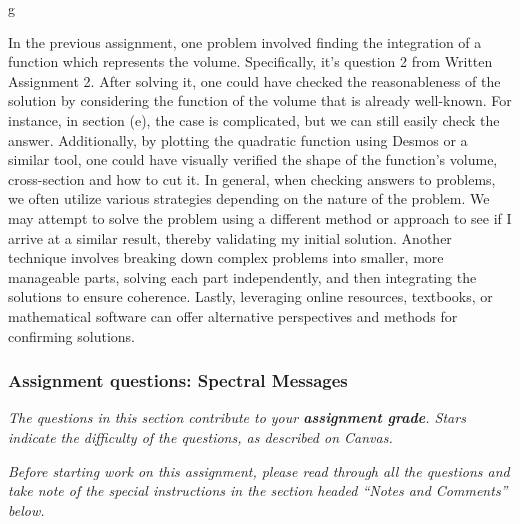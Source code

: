\documentclass{exam}
\begin{document}
\begin{questions}

g
\begin{solution}
    In the previous assignment, one problem involved finding the integration of a function which represents the volume. Specifically, it's question 2 from Written Assignment 2.  After solving it, one could have checked the reasonableness of the solution by considering the function of the volume that is already well-known. For instance, in section (e), the case is complicated, but we can still easily check the answer. Additionally, by plotting the quadratic function using Desmos or a similar tool, one could have visually verified the shape of the function's volume, cross-section and how to cut it. In general, when checking answers to problems, we often utilize various strategies depending on the nature of the problem. We may attempt to solve the problem using a different method or approach to see if I arrive at a similar result, thereby validating my initial solution. Another technique involves breaking down complex problems into smaller, more manageable parts, solving each part independently, and then integrating the solutions to ensure coherence. Lastly, leveraging online resources, textbooks, or mathematical software can offer alternative perspectives and methods for confirming solutions.
\end{solution}

\end{questions}
\vfill\clearpage

\subsubsection*{Assignment questions: Spectral Messages}

\noindent
\textit{The questions in this section contribute to your \textbf{assignment grade}.
Stars indicate the difficulty of the questions, as described on Canvas.}

\smallskip
\noindent
\textit{Before starting work on this assignment,
please read through all the questions and take note
of the special instructions in the section headed
``Notes and Comments'' below.}


\bigskip
\end{document}
